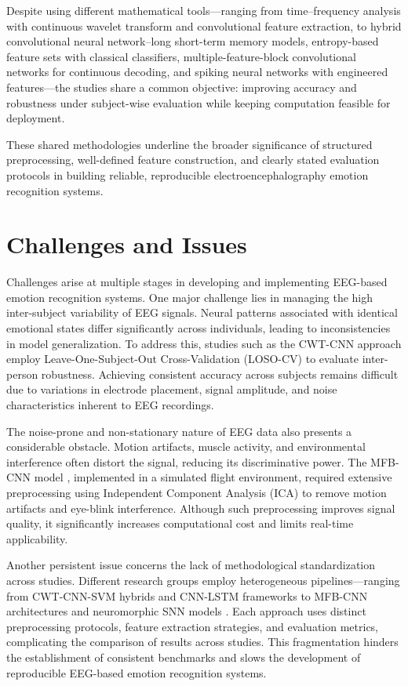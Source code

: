 \documentclass[conference]{IEEEtran}
\begin{document}
Despite using different mathematical tools—ranging from time–frequency analysis with continuous wavelet transform and convolutional feature extraction, to hybrid convolutional neural network–long short-term memory models, entropy-based feature sets with classical classifiers, multiple-feature-block convolutional networks for continuous decoding, and spiking neural networks with engineered features—the studies share a common objective: improving accuracy and robustness under subject-wise evaluation while keeping computation feasible for deployment. 

These shared methodologies underline the broader significance of structured preprocessing, well-defined feature construction, and clearly stated evaluation protocols in building reliable, reproducible electroencephalography emotion recognition systems.


\section{Challenges and Issues}
Challenges arise at multiple stages in developing and implementing EEG-based emotion recognition systems. One major challenge lies in managing the high inter-subject variability of EEG signals. Neural patterns associated with identical emotional states differ significantly across individuals, leading to inconsistencies in model generalization. To address this, studies such as the CWT-CNN approach \cite{Bagherzadeh2023HybridEEGWaveletCNN_SVM} employ Leave-One-Subject-Out Cross-Validation (LOSO-CV) to evaluate inter-person robustness. Achieving consistent accuracy across subjects remains difficult due to variations in electrode placement, signal amplitude, and noise characteristics inherent to EEG recordings.

The noise-prone and non-stationary nature of EEG data also presents a considerable obstacle. Motion artifacts, muscle activity, and environmental interference often distort the signal, reducing its discriminative power. The MFB-CNN model \cite{Lee2020MFB_CNN_PilotMentalStates}, implemented in a simulated flight environment, required extensive preprocessing using Independent Component Analysis (ICA) to remove motion artifacts and eye-blink interference. Although such preprocessing improves signal quality, it significantly increases computational cost and limits real-time applicability.

Another persistent issue concerns the lack of methodological standardization across studies. Different research groups employ heterogeneous pipelines—ranging from CWT-CNN-SVM hybrids \cite{Bagherzadeh2023HybridEEGWaveletCNN_SVM} and CNN-LSTM frameworks \cite{Chakravarthi2022EEGHybridCNNLSTM} to MFB-CNN architectures \cite{Lee2020MFB_CNN_PilotMentalStates} and neuromorphic SNN models \cite{Luo2020SNN_EEGEmotion}. Each approach uses distinct preprocessing protocols, feature extraction strategies, and evaluation metrics, complicating the comparison of results across studies. This fragmentation hinders the establishment of consistent benchmarks and slows the development of reproducible EEG-based emotion recognition systems.
\end{document}
